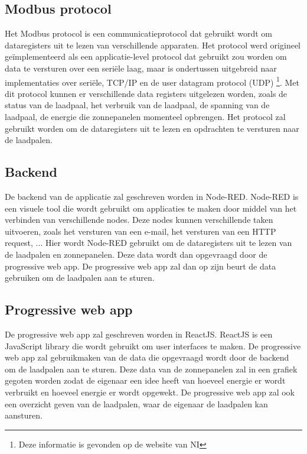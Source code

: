 \subsection{Modbus protocol}%
\label{sub:modbus_protocol}
Het Modbus protocol is een communicatieprotocol dat gebruikt wordt om dataregisters uit te lezen van verschillende apparaten. Het protocol werd origineel geïmplementeerd als een applicatie-level protocol dat gebruikt zou worden om data te versturen over een seriële laag, maar is ondertussen uitgebreid naar implementaties over seriële, TCP/IP en de user datagram protocol (UDP) \footnote{Deze informatie is gevonden op de website van NI}. Met dit protocol kunnen er verschillende data registers uitgelezen worden, zoals de status van de laadpaal, het verbruik van de laadpaal, de spanning van de laadpaal, de energie die zonnepanelen momenteel opbrengen. Het protocol zal gebruikt worden om de dataregisters uit te lezen en opdrachten te versturen naar de laadpalen.

\subsection{Backend}%
\label{sub:backend}
De backend van de applicatie zal geschreven worden in Node-RED. Node-RED is een visuele tool die wordt gebruikt om applicaties te maken door middel van het verbinden van verschillende nodes. Deze nodes kunnen verschillende taken uitvoeren, zoals het versturen van een e-mail, het versturen van een HTTP request, ... Hier wordt Node-RED gebruikt om de dataregisters uit te lezen van de laadpalen en zonnepanelen. Deze data wordt dan opgevraagd door de progressive web app. De progressive web app zal dan op zijn beurt de data gebruiken om de laadpalen aan te sturen.

\subsection{Progressive web app}%
\label{sub:progressive_web_app}
De progressive web app zal geschreven worden in ReactJS. ReactJS is een JavaScript library die wordt gebruikt om user interfaces te maken. De progressive web app zal gebruikmaken van de data die opgevraagd wordt door de backend om de laadpalen aan te sturen. Deze data van de zonnepanelen zal in een grafiek gegoten worden zodat de eigenaar een idee heeft van hoeveel energie er wordt verbruikt en hoeveel energie er wordt opgewekt. De progressive web app zal ook een overzicht geven van de laadpalen, waar de eigenaar de laadpalen kan aansturen.

